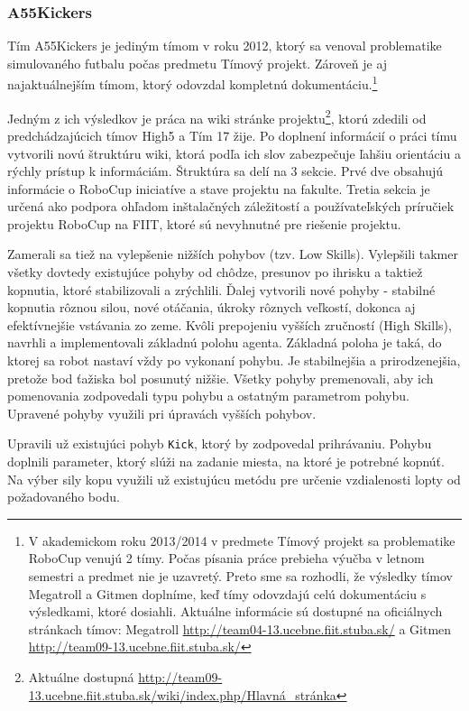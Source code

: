 \subsubsection{A55Kickers}\label{A55Kickers}

Tím A55Kickers \cite{A55Kickers} je jediným tímom v roku 2012, ktorý sa venoval problematike simulovaného futbalu počas predmetu Tímový projekt. Zároveň je aj najaktuálnejším tímom, ktorý odovzdal kompletnú dokumentáciu.\footnote{V akademickom roku 2013/2014 v predmete Tímový projekt sa problematike RoboCup venujú 2 tímy. Počas písania práce prebieha výučba v letnom semestri a predmet nie je uzavretý. Preto sme sa rozhodli, že výsledky tímov Megatroll a Gitmen doplníme, keď tímy odovzdajú celú dokumentáciu s výsledkami, ktoré dosiahli. Aktuálne informácie sú dostupné na oficiálnych stránkach tímov: Megatroll \url{http://team04-13.ucebne.fiit.stuba.sk/} a Gitmen \url{http://team09-13.ucebne.fiit.stuba.sk/}}

Jedným z ich výsledkov je práca na wiki stránke projektu\footnote{Aktuálne dostupná \url{http://team09-13.ucebne.fiit.stuba.sk/wiki/index.php/Hlavná_stránka}}, ktorú zdedili od predchádzajúcich tímov High5 a Tím 17 žije. Po doplnení informácií o práci tímu vytvorili novú štruktúru wiki, ktorá podľa ich slov zabezpečuje ľahšiu orientáciu a rýchly prístup k informáciám. Štruktúra sa delí na 3 sekcie. Prvé dve obsahujú informácie o RoboCup iniciatíve a stave projektu na fakulte. Tretia sekcia je určená ako podpora ohľadom inštalačných záležitostí a používateľských príručiek projektu RoboCup na FIIT, ktoré sú nevyhnutné pre riešenie projektu.

Zamerali sa tiež na vylepšenie nižších pohybov (tzv. Low Skills). Vylepšili takmer všetky dovtedy existujúce pohyby od chôdze, presunov po ihrisku a taktiež kopnutia, ktoré stabilizovali a zrýchlili. Ďalej vytvorili nové pohyby - stabilné kopnutia rôznou silou, nové otáčania, úkroky rôznych veľkostí, dokonca aj efektívnejšie vstávania zo zeme. Kvôli prepojeniu vyšších zručností (High Skills), navrhli a implementovali základnú polohu agenta. Základná poloha je taká, do ktorej sa robot nastaví vždy po vykonaní pohybu. Je stabilnejšia a prirodzenejšia, pretože bod ťažiska bol posunutý nižšie. Všetky pohyby premenovali, aby ich pomenovania zodpovedali typu pohybu a ostatným parametrom pohybu. Upravené pohyby využili pri úpravách vyšších pohybov.

Upravili už existujúci pohyb \texttt{Kick}, ktorý by zodpovedal prihrávaniu. Pohybu doplnili parameter, ktorý slúži na zadanie miesta, na ktoré je potrebné kopnúť. Na výber sily kopu využili už existujúcu metódu pre určenie vzdialenosti lopty od požadovaného bodu.



